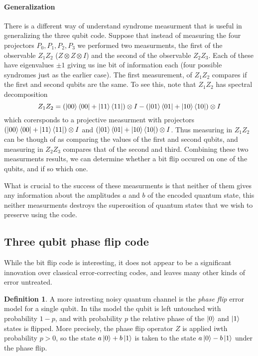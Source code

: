 \documentclass[11pt,a4paper]{article}
\theoremstyle{definition}
\newtheorem{definition}{Definition}[section]
\theoremstyle{plain}
\theoremstyle{remark}
\begin{document}
\paragraph{Generalization} 
There is a different way of understand syndrome measurment that is useful in generalizing the three qubit code. Suppose that 
instead of measuring the four projectors $P_0, P_1, P_2, P_3$ we performed two measurments, the first of the observable $Z_1 Z_2$ ($Z \otimes Z \otimes I$) and the second of the observable $Z_2 Z_3$. 
Each of these have eigenvalues $\pm 1$ giving us ine bit of information each (four possible syndromes just as the earlier case). The first measurement, of $Z_1 Z_2$ compares if the first and second qubits are the same. 
To see this, note that $Z_1 Z_2$ has spectral decomposition 
$$Z_1 Z_2 = \left(\ket{00} \bra{00} + \ket{11} \bra{11}\right) \otimes I - \left(\ket{01} \bra{01} + \ket{10} \bra{10}\right) \otimes I$$
which corersponds to a projective measurment with projectors $\left(\ket{00} \bra{00} + \ket{11} \bra{11}\right) \otimes I$ and $\left(\ket{01} \bra{01} + \ket{10} \bra{10}\right) \otimes I$. 
Thus measuring in $Z_1 Z_2$ can be though of as comparing the values of the first and second qubits, and measuring in $Z_2 Z_3$ compares that of the second and third. Combining these two measurments results, we can determine whether a bit flip 
occured on one of the qubits, and if so which one. 

What is crucial to the success of these measurments is that neither of them gives any information about the amplitudes $a$ and $b$ of the encoded quantum state, this neither measurments destroys the superosition of quantum states that we wish to preserve using the code. 

\subsection{Three qubit phase flip code}
While the bit flip code is interesting, it does not appear to be a significant innovation over classical error-correcting codes, and leaves many other kinds of error untreated. 

\begin{definition}
  A more intresting noisy quantum channel is the \emph{phase flip} error model for a single qubit. In tihs model the 
  qubit is left untouched with probability $1-p$, and with probability $p$ the relative phase of the $\ket{0}$ and $\ket{1}$ states is flipped. 
  More precisely, the phase flip operator $Z$ is applied iwth probability $p > 0$, so the state $a \ket{0} + b \ket{1}$ is taken to the state 
  $a \ket{0} - b \ket{1}$ under the phase flip.
\end{definition}
\end{document}
